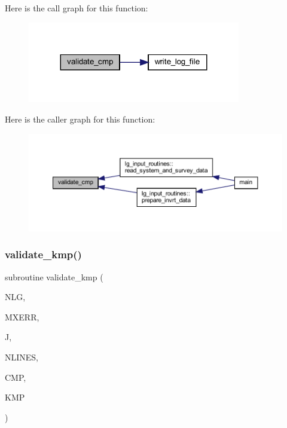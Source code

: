 Here is the call graph for this function\+:\nopagebreak
\begin{figure}[H]
\begin{center}
\leavevmode
\includegraphics[width=263pt]{Leroi_8f90_aa934c3b9754a6a8e18f83b6de33a0df8_cgraph}
\end{center}
\end{figure}
Here is the caller graph for this function\+:\nopagebreak
\begin{figure}[H]
\begin{center}
\leavevmode
\includegraphics[width=350pt]{Leroi_8f90_aa934c3b9754a6a8e18f83b6de33a0df8_icgraph}
\end{center}
\end{figure}
\mbox{\label{Leroi_8f90_a2cd90fa43f6deaeb4a86b02b8494d638}} 
\subsubsection{\texorpdfstring{validate\+\_\+kmp()}{validate\_kmp()}}
{\footnotesize\ttfamily subroutine validate\+\_\+kmp (\begin{DoxyParamCaption}\item[{integer}]{N\+LG,  }\item[{integer}]{M\+X\+E\+RR,  }\item[{integer}]{J,  }\item[{integer}]{N\+L\+I\+N\+ES,  }\item[{integer, dimension(nlines)}]{C\+MP,  }\item[{integer, dimension(nlines)}]{K\+MP }\end{DoxyParamCaption})}

